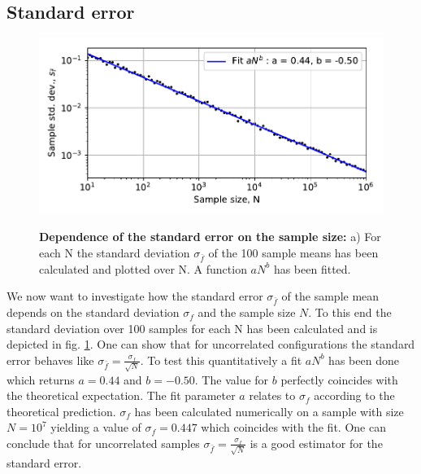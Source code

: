 \documentclass[11pt, a4paper]{article}
\begin{document}
    \subsection{Standard error}
        \begin{figure}
            \includegraphics{fig2.pdf}
            \label{fig2}
            \caption{\textbf{Dependence of the standard error on the sample size:} a) For each N the standard deviation $\sigma_{\bar{f}}$ of the 100 sample means has been calculated and plotted over N. A function $aN^b$ has been fitted.}
        \end{figure}
        We now want to investigate how the standard error $\sigma_{\bar{f}}$ of the sample mean depends on the standard deviation $\sigma_f$ and the sample size $N$. To this end the standard deviation over 100 samples for each N has been calculated and is depicted in fig. \ref{fig2}. One can show that for uncorrelated configurations the standard error behaves like $\sigma_{\bar{f}} = \frac{\sigma_f}{\sqrt{N}}$. To test this quantitatively a fit $aN^b$ has been done which returns $a = 0.44$ and $b = -0.50$. The value for $b$ perfectly coincides with the theoretical expectation. The fit parameter $a$ relates to $\sigma_f$ according to the theoretical prediction. $\sigma_f$ has been calculated numerically on a sample with size $N = 10^7$ yielding a value of $\sigma_f = 0.447$ which coincides with the fit. One can conclude that for uncorrelated samples $\sigma_{\bar{f}} = \frac{\sigma_f}{\sqrt{N}}$ is a good estimator for the standard error.
\end{document}
